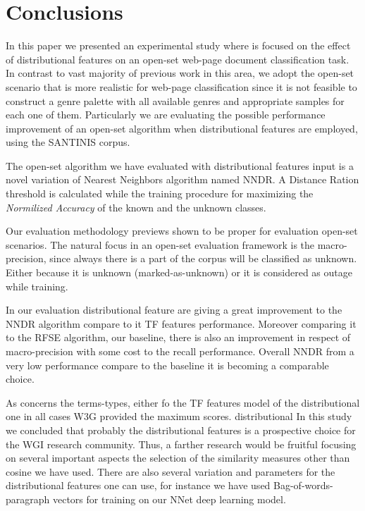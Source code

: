 
\section{Conclusions}\label{sec:conclusions}

In this paper we presented an experimental study where is focused on the effect of distributional features on an open-set web-page document classification task. In contrast to vast majority of previous work in this area, we adopt the open-set scenario that is more realistic for  web-page classification since it is not feasible to construct a genre palette with all available genres and appropriate samples for each one of them. Particularly we are evaluating the possible performance improvement of an open-set algorithm when distributional features are employed, using the SANTINIS corpus.

The open-set algorithm we have evaluated with distributional features input is a novel variation of Nearest Neighbors algorithm named NNDR. A Distance Ration threshold is calculated while the training procedure for maximizing the \textit{Normilized Accuracy} of the known and the unknown classes.

Our evaluation methodology previews shown to be proper for evaluation open-set scenarios. The natural focus in an open-set evaluation framework is the macro-precision, since always there is a part of the corpus will be classified as unknown. Either because it is unknown (marked-as-unknown) or it is considered as outage while training.

In our evaluation distributional feature are giving a great improvement to the NNDR algorithm compare to it TF features performance. Moreover comparing it to the RFSE algorithm, our baseline, there is also an improvement in respect of macro-precision with some cost to the recall performance. Overall NNDR from a very low performance compare to the baseline it is becoming a comparable choice.

As concerns the terms-types, either fo the TF features model of the distributional one in all cases W3G provided the maximum scores.
distributional
In this study we concluded that probably the distributional features is a prospective choice for the WGI research community. Thus, a farther research would be fruitful focusing on several important aspects the selection of the similarity measures other than cosine we have used. There are also several variation and parameters for the distributional features one can use, for instance we have used Bag-of-words-paragraph vectors for training on our NNet deep learning model.


